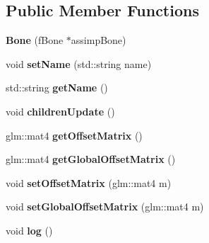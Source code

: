 \subsection*{Public Member Functions}
\begin{DoxyCompactItemize}
\item 
\hypertarget{classfillwave_1_1animation_1_1Bone_afa7317cf0f1b09facd283417758e56c5}{}{\bfseries Bone} (f\+Bone $\ast$assimp\+Bone)\label{classfillwave_1_1animation_1_1Bone_afa7317cf0f1b09facd283417758e56c5}

\item 
\hypertarget{classfillwave_1_1animation_1_1Bone_aa3ff08b4ea9dca6a1714cc3f0099f97b}{}void {\bfseries set\+Name} (std\+::string name)\label{classfillwave_1_1animation_1_1Bone_aa3ff08b4ea9dca6a1714cc3f0099f97b}

\item 
\hypertarget{classfillwave_1_1animation_1_1Bone_a61463290a15ed77fdee6ae9a252b7352}{}std\+::string {\bfseries get\+Name} ()\label{classfillwave_1_1animation_1_1Bone_a61463290a15ed77fdee6ae9a252b7352}

\item 
\hypertarget{classfillwave_1_1animation_1_1Bone_a425efaefd5f5d05df0dbdffc2fddce04}{}void {\bfseries children\+Update} ()\label{classfillwave_1_1animation_1_1Bone_a425efaefd5f5d05df0dbdffc2fddce04}

\item 
\hypertarget{classfillwave_1_1animation_1_1Bone_a03d9f9b8377b6cde6e8a20babb6ff938}{}glm\+::mat4 {\bfseries get\+Offset\+Matrix} ()\label{classfillwave_1_1animation_1_1Bone_a03d9f9b8377b6cde6e8a20babb6ff938}

\item 
\hypertarget{classfillwave_1_1animation_1_1Bone_a4d2782d1e9bf0f54515d39fd5c025591}{}glm\+::mat4 {\bfseries get\+Global\+Offset\+Matrix} ()\label{classfillwave_1_1animation_1_1Bone_a4d2782d1e9bf0f54515d39fd5c025591}

\item 
\hypertarget{classfillwave_1_1animation_1_1Bone_a2caf977e2956b3a29da98735dc67215a}{}void {\bfseries set\+Offset\+Matrix} (glm\+::mat4 m)\label{classfillwave_1_1animation_1_1Bone_a2caf977e2956b3a29da98735dc67215a}

\item 
\hypertarget{classfillwave_1_1animation_1_1Bone_ac0fb24acdd96adaed1f27312c4ebe98c}{}void {\bfseries set\+Global\+Offset\+Matrix} (glm\+::mat4 m)\label{classfillwave_1_1animation_1_1Bone_ac0fb24acdd96adaed1f27312c4ebe98c}

\item 
\hypertarget{classfillwave_1_1animation_1_1Bone_a57b96cef305fc0b3a93d0dc4fc46f455}{}void {\bfseries log} ()\label{classfillwave_1_1animation_1_1Bone_a57b96cef305fc0b3a93d0dc4fc46f455}

\end{DoxyCompactItemize}
